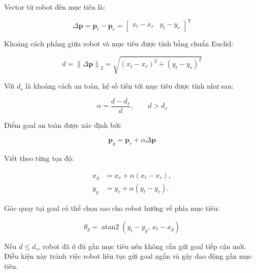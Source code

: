 Vector từ robot đến mục tiêu là:

\begin{equation}
    \Delta\mathbf{p}
    =
    \mathbf{p}_t-\mathbf{p}_r
    =
    \begin{bmatrix}
        x_t-x_r & y_t-y_r
    \end{bmatrix}^{\mathsf{T}}
    \label{eq:robot-target-vector}
\end{equation}

Khoảng cách phẳng giữa robot và mục tiêu được tính bằng chuẩn Euclid:

\begin{equation}
    d
    =
    \left\lVert\Delta\mathbf{p}\right\rVert_2
    =
    \sqrt{(x_t-x_r)^2+(y_t-y_r)^2}
    \label{eq:robot-target-distance}
\end{equation}

Với $d_s$ là khoảng cách an toàn, hệ số tiến tới mục tiêu được tính như sau:

\begin{equation}
    \alpha = \frac{d-d_s}{d},
    \qquad d>d_s
    \label{eq:safe-goal-alpha}
\end{equation}

Điểm goal an toàn được xác định bởi:

\begin{equation}
    \mathbf{p}_g
    =
    \mathbf{p}_r+\alpha\Delta\mathbf{p}
    \label{eq:safe-goal-vector}
\end{equation}

Viết theo từng tọa độ:

\begin{align}
    x_g &= x_r+\alpha(x_t-x_r), \label{eq:safe-goal-x}\\
    y_g &= y_r+\alpha(y_t-y_r). \label{eq:safe-goal-y}
\end{align}

Góc quay tại goal có thể chọn sao cho robot hướng về phía mục tiêu:

\begin{equation}
    \theta_g
    =
    \operatorname{atan2}(y_t-y_g,\,x_t-x_g)
    \label{eq:safe-goal-heading}
\end{equation}

Nếu $d\leq d_s$, robot đã ở đủ gần mục tiêu nên không cần gửi goal tiếp cận mới. Điều kiện này tránh việc robot liên tục gửi goal ngắn và gây dao động gần mục tiêu.

